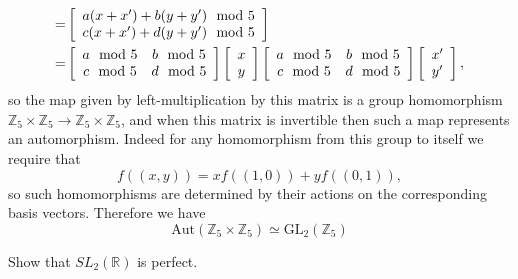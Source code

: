 \documentclass{article}
\newcounter{Problem}
\newenvironment{Problem}{\begin{Exercise}[name={Problem},
                                          counter={Problem}]}
                        {\end{Exercise}}
\begin{document}
\begin{Answer}
\begin{enumerate}
{\begin{align*}
        =& 
        \left[\begin{array}{c}
          a(x + x^\prime) + b(y + y^\prime) \mod 5 \\ 
          c(x + x^\prime) + d(y + y^\prime) \mod 5
        \end{array}\right] \\
        =&
        \left[\begin{array}{c c}
          a \mod 5 & b \mod 5 \\
          c \mod 5 & d \mod 5
        \end{array}\right]
        \left[\begin{array}{c}
          x \\ y
        \end{array}\right]
        \left[\begin{array}{c c}
          a \mod 5 & b \mod 5 \\
          c \mod 5 & d \mod 5
        \end{array}\right]
        \left[\begin{array}{c}
          x^\prime \\ y^\prime
        \end{array}\right],
       \end{align*}
        so the map given by left-multiplication by this matrix is
        a group homomorphism 
        $\mathbb{Z}_5 \times \mathbb{Z}_5 \to 
         \mathbb{Z}_5 \times \mathbb{Z}_5$,
        and when this matrix is invertible then such a map represents an
        automorphism. Indeed for any homomorphism from this group to
        itself we require that 
        $$
        f((x,y))
        = x f((1, 0)) + y f((0, 1)),
        $$
        so such homomorphisms are determined by their actions on the
        corresponding basis vectors.
        Therefore we have
        $$
        \mathrm{Aut}(\mathbb{Z}_5 \times \mathbb{Z}_5)
        \simeq \mathrm{GL}_2(\mathbb{Z}_5)
        $$
       }
\end{enumerate}

\end{Answer}

\pagebreak

\begin{Problem}
Show that $SL_2(\mathbb{R})$ is perfect.
\end{Problem}
\end{document}
